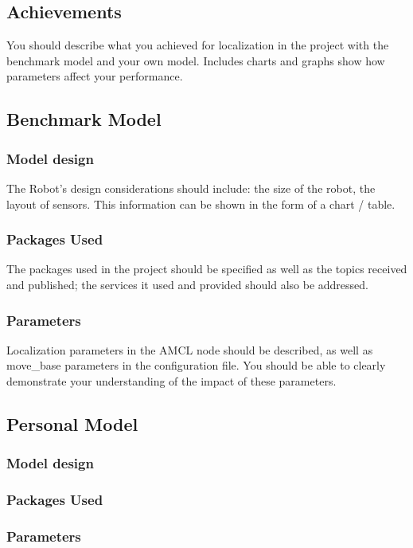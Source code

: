 \documentclass[10pt,journal,compsoc]{IEEEtran}
\begin{document}
\subsection{Achievements}
You should describe what you achieved for localization in the project with the benchmark model and your own model. Includes charts and graphs show how parameters affect your performance. 

\subsection{Benchmark Model}
\subsubsection{Model design}
The Robot's design considerations should include: the size of the robot, the layout of sensors. This information can be shown in the form of a chart / table.

\subsubsection{Packages Used}
The packages used in the project should be specified as well as the topics received and published; the services it used and provided should also be addressed. 

\subsubsection{Parameters}
Localization parameters in the AMCL node should be described, as well as move\_base parameters in the configuration file. You should be able to clearly demonstrate your understanding of the impact of these parameters.

\subsection{Personal Model}
\subsubsection{Model design}
\subsubsection{Packages Used}
\subsubsection{Parameters}
\end{document}
